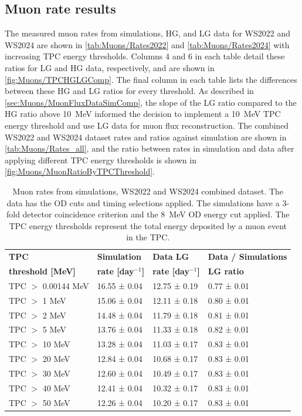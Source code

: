 \subsection{Muon rate results}\label{sec:Muons/MuonRateResults}
The measured muon rates from simulations, HG, and LG data for WS2022 and WS2024 are shown in \autoref{tab:Muons/Rates2022} and \autoref{tab:Muons/Rates2024} with increasing TPC energy thresholds. Columns 4 and 6 in each table detail these ratios for LG and HG data, respectively, and are shown in \autoref{fig:Muons/TPCHGLGComp}. The final column in each table lists the differences between these HG and LG ratios for every threshold. As described in \autoref{sec:Muons/MuonFluxDataSimComp}, the slope of the LG ratio compared to the HG ratio above 10~MeV informed the decision to implement a 10~MeV TPC energy threshold and use LG data for muon flux reconstruction. The combined WS2022 and WS2024 dataset rates and ratios against simulation are shown in \autoref{tab:Muons/Rates_all}, and the ratio between rates in simulation and data after applying different TPC energy thresholds is shown in \autoref{fig:Muons/MuonRatioByTPCThreshold}.

\begin{table}[h!]
    \centering
    \caption[Muon rates from simulations, WS2022 and WS2024 combined dataset.]{Muon rates from simulations, WS2022 and WS2024 combined dataset. The data has the OD cuts and timing selections applied. The simulations have a 3-fold detector coincidence criterion and the 8~MeV OD energy cut applied. The TPC energy thresholds represent the total energy deposited by a muon event in the TPC.}
    \begin{tabular}{llll}
    \hline\hline
    \textbf{TPC} & \textbf{Simulation} & \textbf{Data LG} & \textbf{Data / Simulations} \\
    \textbf{threshold [MeV]} & \textbf{rate [day$^{-1}$]} & \textbf{rate [day$^{-1}$]} & \textbf{LG ratio}\\
    \hline
    TPC $>$ 0.00144 MeV & 16.55 ± 0.04 & 12.75 ± 0.19 & 0.77 ± 0.01 \\ 
    TPC $>$ 1 MeV & 15.06 ± 0.04 & 12.11 ± 0.18 & 0.80 ± 0.01\\ 
    TPC $>$ 2 MeV & 14.48 ± 0.04 & 11.79 ± 0.18 & 0.81 ± 0.01 \\ 
    TPC $>$ 5 MeV & 13.76 ± 0.04 & 11.33 ± 0.18 & 0.82 ± 0.01  \\ 
    TPC $>$ 10 MeV & 13.28 ± 0.04 & 11.03 ± 0.17 & 0.83 ± 0.01 \\ 
    TPC $>$ 20 MeV & 12.84 ± 0.04 & 10.68 ± 0.17 & 0.83 ± 0.01  \\ 
    TPC $>$ 30 MeV & 12.60 ± 0.04 & 10.49 ± 0.17 & 0.83 ± 0.01  \\ 
    TPC $>$ 40 MeV & 12.41 ± 0.04 & 10.32 ± 0.17 & 0.83 ± 0.01  \\ 
    TPC $>$ 50 MeV & 12.26 ± 0.04 & 10.20 ± 0.17 & 0.83 ± 0.01 \\
    \hline\hline
    \end{tabular}
    \label{tab:Muons/Rates_all}
\end{table}

